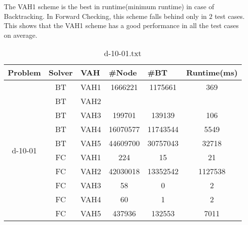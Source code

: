 \documentclass{article}
\begin{document}
The VAH1 scheme is the best in runtime(minimum runtime) in case of Backtracking. In Forward Checking, this scheme falls behind only in $2$ test cases. This shows that the VAH1 scheme has a good performance in all the test cases on average.

\newpage
\begin{table}[]
\caption{d-10-01.txt}
\begin{tabular}{|c|c|c|c|c|c|}
\hline
Problem                   & Solver & \multicolumn{1}{l|}{VAH} & \multicolumn{1}{l|}{\#Node} & \multicolumn{1}{l|}{\#BT} & \multicolumn{1}{l|}{Runtime(ms)} \\ \hline
\multirow{10}{*}{d-10-01} & BT     & VAH1                     & 1666221                     & 1175661                   & 369                              \\ \cline{2-6} 
 & BT & VAH2 &          &           &       \\ \cline{2-6} 
 & BT & VAH3 & 199701   & 139139    & 106   \\ \cline{2-6} 
 & BT & VAH4 & 16070577 & 11743544  & 5549  \\ \cline{2-6} 
 & BT & VAH5 & 44609700 & 30757043  & 32718 \\ \cline{2-6} 
 & FC & VAH1 & 224      & 15        & 21    \\ \cline{2-6} 
 & FC & VAH2 & 42030018 & 13352542  & 1127538  \\ \cline{2-6} 
 & FC & VAH3 & 58       & 0         & 2     \\ \cline{2-6} 
 & FC & VAH4 & 60       & 1         & 2     \\ \cline{2-6} 
 & FC & VAH5 & 437936   & 132553         & 7011      \\ \hline
\end{tabular}
\end{table}
\end{document}
